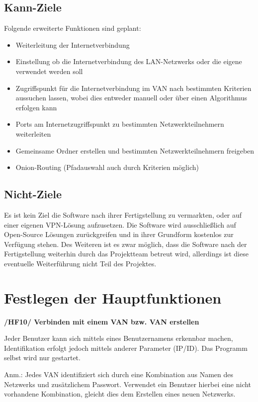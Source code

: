\documentclass[a4paper,12pt]{scrreprt}
\begin{document}
		\subsection{Kann-Ziele}
			Folgende erweiterte Funktionen sind geplant:
			\begin{itemize}
			\item Weiterleitung der Internetverbindung
			\item Einstellung ob die Internetverbindung des LAN-Netzwerks oder die eigene verwendet werden soll
			\item Zugriffspunkt für die Internetverbindung im VAN nach bestimmten Kriterien aussuchen lassen, wobei dies entweder manuell oder über einen Algorithmus erfolgen kann
			
			\item Ports am Internetzugriffspunkt zu bestimmten Netzwerkteilnehmern weiterleiten
			\item Gemeinsame Ordner erstellen und bestimmten Netzwerkteilnehmern freigeben
			
			\item Onion-Routing (Pfadauswahl auch durch Kriterien möglich)
			
			\end{itemize}
			
		\subsection{Nicht-Ziele}
			Es ist kein Ziel die Software nach ihrer Fertigstellung zu vermarkten, oder auf einer eigenen VPN-Lösung aufzusetzen. Die Software wird ausschließlich auf Open-Source Lösungen zurückgreifen und in ihrer Grundform kostenlos zur Verfügung stehen. Des Weiteren ist es zwar möglich, dass die Software nach der Fertigstellung weiterhin durch das Projektteam betreut wird, allerdings ist diese eventuelle Weiterführung nicht Teil des Projektes.
			
	\section{Festlegen der Hauptfunktionen}
		\textbf{/HF10/ Verbinden mit einem VAN bzw. VAN erstellen}
		
		Jeder Benutzer kann sich mittels eines Benutzernamens erkennbar machen, Identifikation erfolgt jedoch mittels anderer Parameter (IP/ID). Das Programm selbst wird nur gestartet.
		
		Anm.: Jedes VAN identifiziert sich durch eine Kombination aus Namen des Netzwerks und zusätzlichem Passwort. Verwendet ein Benutzer hierbei eine nicht vorhandene Kombination, gleicht dies dem Erstellen eines neuen Netzwerks. 
		
\end{document}
